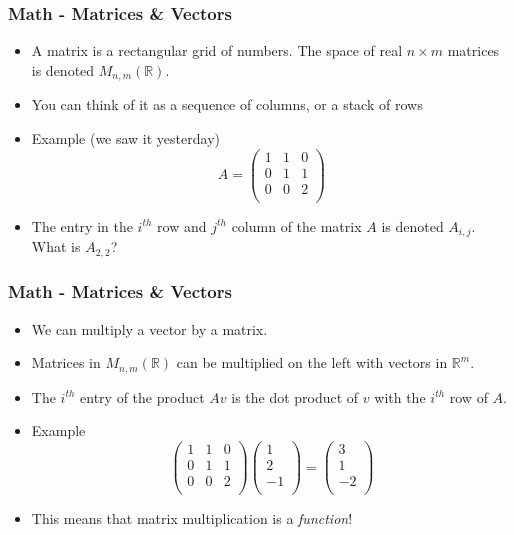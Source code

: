 \documentclass{beamer}
\newcommand{\R}{\mathbb{R}}
\begin{document}
\frame
{
\frametitle{Math - Matrices \& Vectors}
\begin{itemize}[<+->]
\item A matrix is a rectangular grid of numbers. The space of real $n\times m$ matrices is denoted $M_{n,m}(\R)$. 
\item You can think of it as a sequence of columns, or a stack of rows 
\item Example (we saw it yesterday)
\[
A = 
\begin{pmatrix}
1 & 1 & 0 \\
0 & 1 & 1 \\
0 & 0 & 2 \\
\end{pmatrix}
\]
\item The entry in the $i^{th}$ row and $j^{th}$ column of the matrix $A$ is denoted $A_{i,j}$. What is $A_{2,2}$?
\end{itemize}
}

\frame
{
\frametitle{Math - Matrices \& Vectors}
\begin{itemize}[<+->]
\item We can multiply a vector by a matrix. 
\item Matrices in $M_{n,m}(\R)$ can be multiplied on the left with vectors in $\R^m$.
\item The $i^{th}$ entry of the product $Av$ is the dot product of $v$ with the $i^{th}$ row of $A$.
\item Example 
\[
\begin{pmatrix}
1 & 1 & 0 \\
0 & 1 & 1 \\
0 & 0 & 2 \\
\end{pmatrix}
\begin{pmatrix}
1\\
2\\
-1\\
\end{pmatrix}
=
\begin{pmatrix}
3\\
1\\
-2\\
\end{pmatrix}
\]
\item This means that matrix multiplication is a \emph{function}! 
\end{itemize}
}
\end{document}
